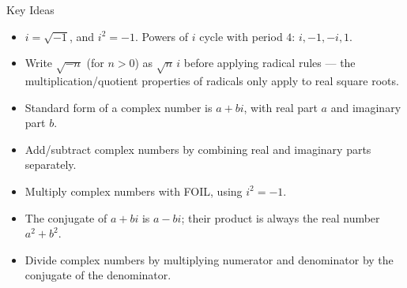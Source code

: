 \documentclass[12pt]{article}
\begin{document}
\begin{friendlyrule}{Key Ideas}
\begin{itemize}
    \item $i=\sqrt{-1}$, and $i^2=-1$. Powers of $i$ cycle with period $4$: $i,-1,-i,1$.
    \item Write $\sqrt{-n}$ (for $n>0$) as $\sqrt{n}\,i$ before applying radical rules --- the multiplication/quotient properties of radicals only apply to real square roots.
    \item Standard form of a complex number is $a+bi$, with real part $a$ and imaginary part $b$.
    \item Add/subtract complex numbers by combining real and imaginary parts separately.
    \item Multiply complex numbers with FOIL, using $i^2=-1$.
    \item The conjugate of $a+bi$ is $a-bi$; their product is always the real number $a^2+b^2$.
    \item Divide complex numbers by multiplying numerator and denominator by the conjugate of the denominator.
\end{itemize}
\end{friendlyrule}
\end{document}
